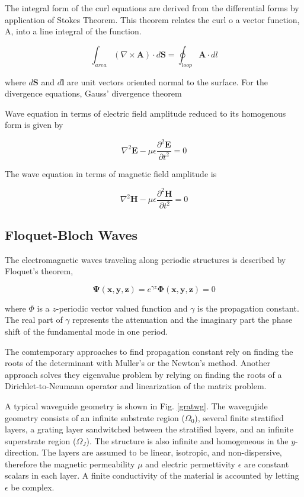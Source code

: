 The integral form of the curl equations are derived from the
differential forms by application of Stokes Theorem. This
theorem relates the curl o a vector function, A, into a line
integral of the function.

\begin{equation}
\int_{area} ( \nabla \times \mathbf{A} ) \cdot d \mathbf{S} = 
\oint_{loop} \mathbf{A} \cdot dl
\end{equation}

where $d \mathbf{S}$ and $d\mathbf{l}$ are unit vectors oriented normal
to the surface. For the divergence equations, Gauss' divergence theorem

Wave equation in terms of electric field amplitude reduced to its
homogenous form is given by

\begin{equation}
\nabla^2 \mathbf{E} - \mu \epsilon \frac{\partial^2 
  \mathbf{E}}{\partial t^2} = 0
\end{equation}

The wave equation in terms of magnetic field amplitude is 

\begin{equation}
\nabla^2 \mathbf{H} - \mu \epsilon \frac{\partial^2 
  \mathbf{H}}{\partial t^2} = 0
\end{equation}

\subsection{Floquet-Bloch Waves}
The electromagnetic waves traveling
along periodic structures is described by Floquet's theorem,

\begin{equation}
\mathbf{\Psi(x,y,z)} = e^{\gamma z} \mathbf{\Phi(x,y,z)} = 0
\label{defD0}
\end{equation}

where $\Phi$ is a $z$-periodic vector valued function and $\gamma$
is the propagation constant. The real part of $\gamma$ represents the
attenuation and the imaginary part the phase shift of the fundamental
mode in one period.

The comtemporary approaches to find propagation constant rely on
finding the roots of the determinant with Muller's or the Newton's
method. Another approach solves they eigenvalue problem by relying on
finding the roots of a Dirichlet-to-Neumann operator and linearization
of the matrix problem.

A typical waveguide geometry is shown in Fig. \ref{gratwg}. The
wavegujide geometry consists of an infinite substrate region
($\Omega_0$), several finite stratified layers, a grating layer
sandwitched between the stratified layers, and an infinite superstrate
region ($\Omega_J$). The structure is also infinite and homogeneous in
the $y$-direction. The layers are assumed to be linear, isotropic, and
non-dispersive, therefore the magnetic permeability $\mu$ and electric
permettivity $\epsilon$ are constant scalars in each layer. A finite
conductivity of the material is accounted by letting $\epsilon$ be
complex.

